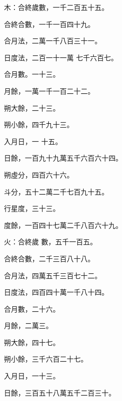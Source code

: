 \begin{pinyinscope}
 木：合終歲數，一千二百五十五。



 合終合數，一千一百四十九。



 合月法，二萬一千八百三十一。



 日度法，二百一十一萬
 七千六百七。



 合月數。一十三。



 月餘，一萬一千一百二十二。



 朔大餘，二十三。



 朔小餘，四千九十三。



 入月日，一
 十五。



 日餘，一百九十九萬五千六百六十四。



 朔虛分，四百六十六。



 斗分，五十二萬二千七百九十五。



 行星度，三十三。



 度餘，一百四十七萬二千八百六十九。



 火：合終歲
 數，五千一百五。



 合終合數，二千三百八十八。



 合月法，四萬五千三百七十二。



 日度法，四百四十萬一千八十四。



 合月數，二十六。



 月餘，二萬三。



 朔大餘，四十七。



 朔小餘，三千六百二十七。



 入月日，一十三。



 日餘，三百五十八萬五千二百三十。




\end{pinyinscope}
